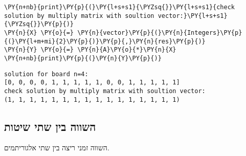 \begin{english}
\begin{tcolorbox}[breakable, size=fbox, boxrule=1pt, pad at break*=1mm,colback=cellbackground, colframe=cellborder]
\begin{Verbatim}[commandchars=\\\{\}]
\PY{n+nb}{print}\PY{p}{(}\PY{l+s+s1}{\PYZsq{}}\PY{l+s+s1}{check solution by multiply matrix with soultion vector:}\PY{l+s+s1}{\PYZsq{}}\PY{p}{)}
\PY{n}{X} \PY{o}{=} \PY{n}{vector}\PY{p}{(}\PY{n}{Integers}\PY{p}{(}\PY{l+m+mi}{2}\PY{p}{)}\PY{p}{,}\PY{n}{res}\PY{p}{)}
\PY{n}{Y} \PY{o}{=} \PY{n}{A}\PY{o}{*}\PY{n}{X}
\PY{n+nb}{print}\PY{p}{(}\PY{n}{Y}\PY{p}{)}
\end{Verbatim}
\end{tcolorbox}

    \begin{Verbatim}[commandchars=\\\{\}]
solution for board n=4:
[0, 0, 0, 0, 1, 1, 1, 1, 1, 0, 0, 1, 1, 1, 1, 1]
check solution by multiply matrix with soultion vector:
(1, 1, 1, 1, 1, 1, 1, 1, 1, 1, 1, 1, 1, 1, 1, 1)
    \end{Verbatim}
\end{english}
\newpage
    \hypertarget{benchmark}{%
\subsection{השווה בין שתי שיטות}\label{benchmark}}
השווה זמני ריצה בין שתי אלגוריתמים.
